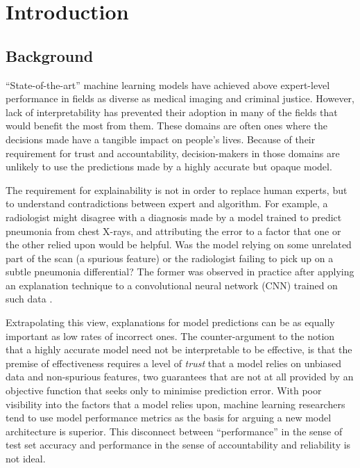 \documentclass[main]{subfiles}
\begin{document}
\chapter{Introduction}

\section{Background} \label{sec:background}

``State-of-the-art'' machine learning models have achieved above expert-level performance in fields as diverse as medical imaging and criminal justice. However, lack of interpretability has prevented their adoption in many of the fields that would benefit the most from them. These domains are often ones where the decisions made have a tangible impact on people's lives. Because of their requirement for trust and accountability, decision-makers in those domains are unlikely to use the predictions made by a highly accurate but opaque model. 

The requirement for explainability is not in order to replace human experts, but to understand contradictions between expert and algorithm. For example, a radiologist might disagree with a diagnosis made by a model trained to predict pneumonia from chest X-rays, and attributing the error to a factor that one or the other relied upon would be helpful. Was the model relying on some unrelated part of the scan (a spurious feature) or the radiologist failing to pick up on a subtle pneumonia differential? The former was observed in practice after applying an explanation technique to a convolutional neural network (CNN) trained on such data \cite{xray}. 

Extrapolating this view, explanations for model predictions can be as equally important as low rates of incorrect ones. The counter-argument to the notion that a highly accurate model need not be interpretable to be effective, is that the premise of effectiveness requires a level of \textit{trust} that a model relies on unbiased data and non-spurious features, two guarantees that are not at all provided by an objective function that seeks only to minimise prediction error. With poor visibility into the factors that a model relies upon, machine learning researchers tend to use model performance metrics as the basis for arguing a new model architecture is superior. This disconnect between ``performance'' in the sense of test set accuracy and performance in the sense of accountability and reliability is not ideal.
\end{document}
